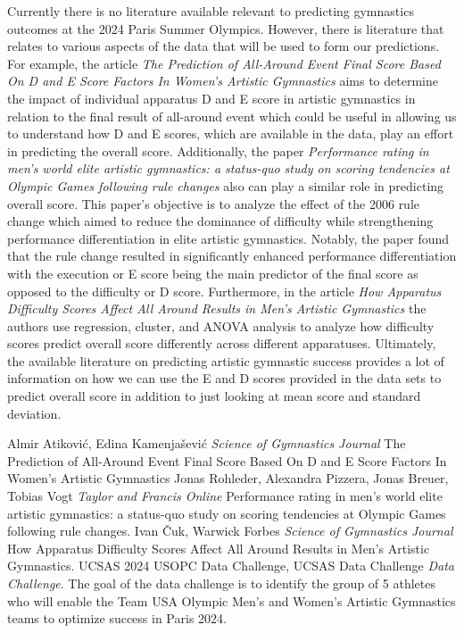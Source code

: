 \documentclass[12pt]{article}
\begin{document}
Currently there is no literature available relevant to predicting gymnastics outcomes at the 2024 
Paris Summer Olympics. However, there is literature that relates to various aspects of the data that 
will be used to form our predictions. For example, the article \textit{The Prediction of All-Around 
Event Final Score Based On D and E Score Factors In Women's Artistic Gymnastics} aims to determine the 
impact of individual apparatus D and E score in artistic gymnastics in relation to the final result of 
all-around event which could be useful in allowing us to understand how D and E scores, which are 
available in the data, play an effort in predicting the overall score. Additionally, the paper 
\textit{Performance rating in men’s world elite artistic gymnastics: a status-quo study on scoring 
tendencies at Olympic Games following rule changes} also can play a similar role in predicting overall 
score. This paper's objective is to analyze the effect of the 2006 rule change which aimed to reduce the 
dominance of difficulty while strengthening performance differentiation  in elite artistic gymnastics. 
Notably, the paper found that the rule change resulted in significantly enhanced performance 
differentiation with the execution or E score being the main predictor of the final score as opposed to 
the difficulty or D score. Furthermore, in the article \textit{How Apparatus Difficulty Scores Affect All 
Around Results in Men's Artistic Gymnastics} the authors use regression, cluster, and ANOVA analysis to 
analyze how difficulty scores predict overall score differently across different apparatuses. Ultimately, 
the available literature on predicting artistic gymnastic success provides a lot of information on how we 
can use the E and D scores provided in the data sets to predict overall score in addition to just looking 
at mean score and standard deviation.

\begin{thebibliography}{999}
  Almir Atiković, Edina Kamenjašević \emph{Science of Gymnastics Journal}
 The Prediction of All-Around Event Final Score Based On D and E Score Factors In Women's Artistic 
 Gymnastics
  Jonas Rohleder, Alexandra Pizzera, Jonas Breuer, Tobias Vogt \emph{Taylor and Francis Online}
  Performance rating in men’s world elite artistic gymnastics: a status-quo study on scoring tendencies 
  at Olympic Games following rule changes.
  Ivan Čuk, Warwick Forbes \emph{Science of Gymnastics Journal}
  How Apparatus Difficulty Scores Affect All Around Results in Men's Artistic Gymnastics.
  UCSAS 2024 USOPC Data Challenge,
 UCSAS Data Challenge \emph{Data Challenge}.
   The goal of the data challenge is to identify the group of 5 athletes who will enable the Team USA 
   Olympic Men’s and Women’s Artistic Gymnastics teams to optimize success in Paris 2024.
\end{thebibliography}


\end{document}
